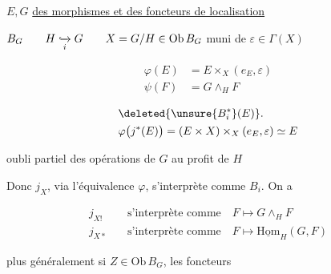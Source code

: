 $E,G$ \hfill \uline{ des morphismes et des foncteurs de localisation}

$B_G\qquad H\lhook\joinrel\xrightarrow[i]{}G\qquad X=G/H\in\mathrm{Ob}\,B_G$ muni de $\varepsilon\in\Gamma(X)$



\[\begin{aligned}\varphi(E)&=E\times_X(e_E,\varepsilon)\\\psi(F)&=G\wedge_H F\end{aligned}\]

\[\begin{aligned}&\deleted{\unsure{B_i^*}(E)}.\\&\varphi\bigl(j^*(E)\bigr)=(E\times X)\times_X(e_E,\varepsilon)\simeq E\end{aligned}\]

oubli partiel des opérations de $G$ au profit de $H$

Donc $j_X$, via l'équivalence $\varphi$, s'interprète comme $B_i$. On a

\[\begin{aligned}j_{X!}&\quad\text{s'interprète comme}\quad F\longmapsto G\wedge_H F\\j_{X*}&\quad\text{s'interprète comme}\quad F\mapsto\underline{\mathrm{Hom}}_H(G,F)\end{aligned}\]

plus généralement si $Z\in\mathrm{Ob}\,B_G$, les foncteurs 


